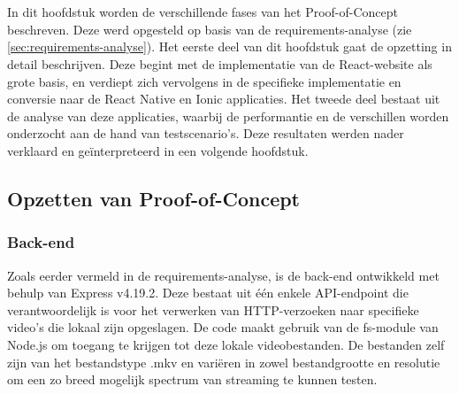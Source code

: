 \chapter{}%
\label{ch:proof-of-concept}



In dit hoofdstuk worden de verschillende fases van het Proof-of-Concept beschreven. Deze werd opgesteld op basis van de requirements-analyse (zie \ref{sec:requirements-analyse}). Het eerste deel van dit hoofdstuk gaat de opzetting in detail beschrijven. Deze begint met de implementatie van de React-website als grote basis, en verdiept zich vervolgens in de specifieke implementatie en conversie naar de React Native en Ionic applicaties. Het tweede deel bestaat uit de analyse van deze applicaties, waarbij de performantie en de verschillen worden onderzocht aan de hand van testscenario's. Deze resultaten werden nader verklaard en geïnterpreteerd in een volgende hoofdstuk.


\section{Opzetten van Proof-of-Concept}
\label{sec:opzetten-proof-of-concept}

\subsection{Back-end}
\label{subsec:back-end}

Zoals eerder vermeld in de requirements-analyse, is de back-end ontwikkeld met behulp van Express v4.19.2. Deze bestaat uit één enkele API-endpoint die verantwoordelijk is voor het verwerken van HTTP-verzoeken naar specifieke video's die lokaal zijn opgeslagen. De code maakt gebruik van de fs-module van Node.js om toegang te krijgen tot deze lokale videobestanden. De bestanden zelf zijn van het bestandstype .mkv en variëren in zowel bestandgrootte en resolutie om een zo breed mogelijk spectrum van streaming te kunnen testen.

